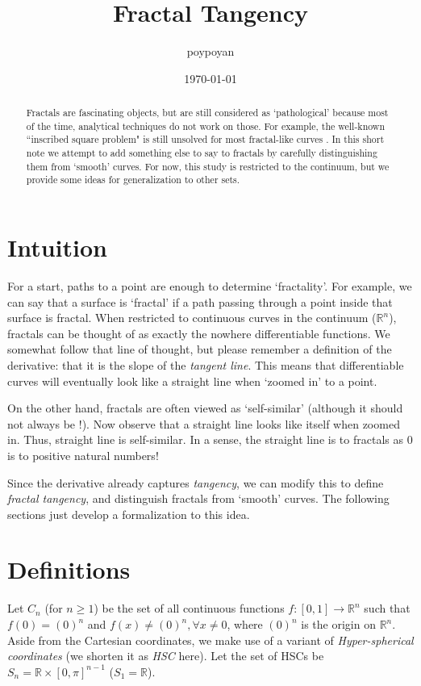 \documentclass{article}
\title{Fractal Tangency}
\author{poypoyan}
\date{\petsa\today}
\theoremstyle{plain}
\begin{document}
\maketitle

\begin{abstract}
Fractals are fascinating objects, but are still considered as `pathological' because most of the time, analytical techniques do not work on those. For example, the well-known ``inscribed square problem" is still unsolved for most fractal-like curves \cite{square}. In this short note we attempt to add something else to say to fractals by carefully distinguishing them from `smooth' curves. For now, this study is restricted to the continuum, but we provide some ideas for generalization to other sets.
\end{abstract}

\section{Intuition}
For a start, paths to a point are enough to determine `fractality'. For example, we can say that a surface is `fractal' if a path passing through a point inside that surface is fractal. When restricted to continuous curves in the continuum ($\mathbb{R}^n$), fractals can be thought of as exactly the nowhere differentiable functions. We somewhat follow that line of thought, but please remember a definition of the derivative: that it is the slope of the \textit{tangent line}. This means that differentiable curves will eventually look like a straight line when `zoomed in' to a point.

On the other hand, fractals are often viewed as `self-similar' (although it should not always be \cite{3b1b}!). Now observe that a straight line looks like itself when zoomed in. Thus, straight line is self-similar. In a sense, the straight line is to fractals as 0 is to positive natural numbers!

Since the derivative already captures \textit{tangency}, we can modify this to define \textit{fractal tangency}, and distinguish fractals from `smooth' curves. The following sections just develop a formalization to this idea.

\section{Definitions}
Let $C_n$ (for $n \ge 1$) be the set of all continuous functions $f:[0,1]\rightarrow\mathbb{R}^n$ such that $f(0)=(0)^n$ and $f(x) \ne (0)^n, \forall x \ne 0$, where $(0)^n$ is the origin on $\mathbb{R}^n$. Aside from the Cartesian coordinates, we make use of a variant of \textit{Hyper-spherical coordinates} (we shorten it as \textit{HSC} here). Let the set of HSCs be $S_n = \mathbb{R} \times [0, \pi]^{n-1}$ ($S_1 = \mathbb{R}$).
\end{document}
